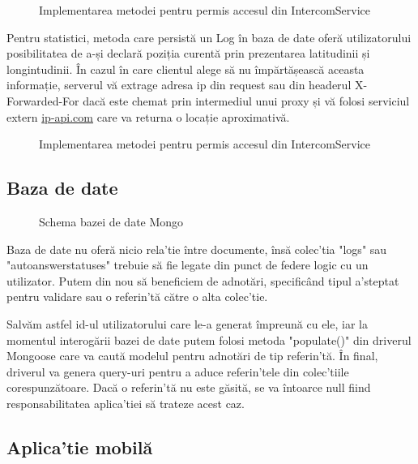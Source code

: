 \begin{figure}[H]
  \centering
  \caption{Implementarea metodei pentru permis accesul din IntercomService}
\end{figure}

Pentru statistici, metoda care persistă un Log în baza de date oferă utilizatorului posibilitatea de a-și declară poziția curentă prin prezentarea latitudinii și longintudinii. În cazul în care clientul alege să nu împărtășească aceasta informație, serverul vă extrage adresa \acrshort{ip} din request sau din headerul X-Forwarded-For dacă este chemat prin intermediul unui proxy și vă folosi serviciul extern \href{http://ip-api.com/json}{ip-api.com} care va returna o locație aproximativă.

\begin{figure}[H]
  \centering
  \caption{Implementarea metodei pentru permis accesul din IntercomService}
\end{figure}

\subsection {Baza de date}

\begin{figure}[h!]
  \centering
  \caption{Schema bazei de date Mongo}
\end{figure}

Baza de date nu oferă nicio rela'tie între documente, însă colec'tia "logs" sau "autoanswerstatuses" trebuie să fie legate din punct de federe logic cu un utilizator. Putem din nou să beneficiem de adnotări, specificând tipul a'steptat pentru validare sau o referin'tă către o alta colec'tie.

Salvăm astfel id-ul utilizatorului care le-a generat împreună cu ele, iar la momentul interogării bazei de date putem folosi metoda "populate()" din driverul Mongoose care va caută modelul pentru adnotări de tip referin'tă. În final, driverul va genera query-uri pentru a aduce referin'tele din colec'tiile corespunzătoare. Dacă o referin'tă nu este găsită, se va întoarce null fiind responsabilitatea aplica'tiei să trateze acest caz. 

\subsection {Aplica'tie mobilă}


